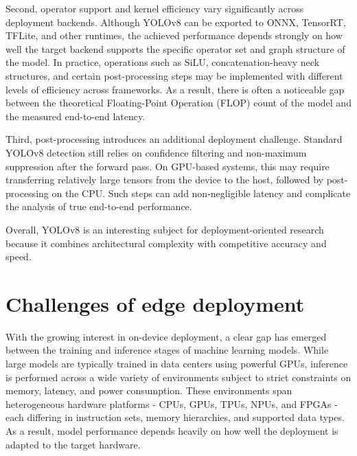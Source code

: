 \documentclass[12pt,a4paper]{report}
\begin{document}
Second, operator support and kernel efficiency vary significantly across deployment backends. Although YOLOv8 can
be exported to ONNX, TensorRT, TFLite, and other runtimes, the achieved performance depends strongly on how well
the target backend supports the specific operator set and graph structure of the model. In practice, operations
such as SiLU, concatenation-heavy neck structures, and certain post-processing steps may be implemented with
different levels of efficiency across frameworks. As a result, there is often a noticeable gap between the
theoretical Floating-Point Operation (FLOP) count of the model and the measured end-to-end latency.

Third, post-processing introduces an additional deployment challenge. Standard YOLOv8 detection still relies on
confidence filtering and non-maximum suppression after the forward pass. On GPU-based systems, this may require
transferring relatively large tensors from the device to the host, followed by post-processing on the CPU. Such
steps can add non-negligible latency and complicate the analysis of true end-to-end performance.

Overall, YOLOv8 is an interesting subject for deployment-oriented research because it combines architectural
complexity with competitive accuracy and speed.


\section{Challenges of edge deployment}

With the growing interest in on-device deployment, a clear gap has emerged between the training and inference
stages of machine learning models. While large models are typically trained in data centers using powerful GPUs,
inference is performed across a wide variety of environments subject to strict constraints on memory, latency,
and power consumption. These environments span heterogeneous hardware platforms - CPUs, GPUs, TPUs, NPUs,
and FPGAs - each differing in instruction sets, memory hierarchies, and supported data types. As a result,
model performance depends heavily on how well the deployment is adapted to the target hardware.
\end{document}
